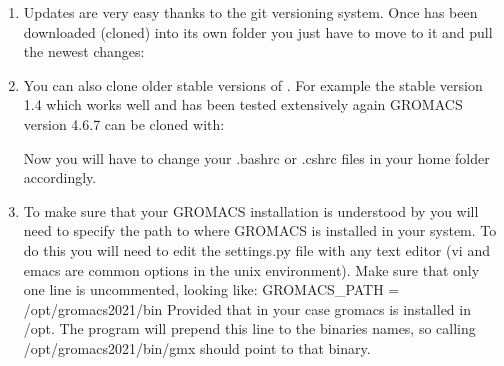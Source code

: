 \documentclass[letterpaper,10pt,english]{sphinxmanual}
\begin{document}
\begin{enumerate}
\item {} 
\sphinxAtStartPar
Updates are very easy thanks to the git versioning system. Once
 has been downloaded (cloned) into its own 
folder you just have to move to it and pull the newest changes:

\begin{sphinxVerbatim}[commandchars=\\\{\}]
 
 
\end{sphinxVerbatim}

\item {} 
\sphinxAtStartPar
You can also clone older stable versions of . For example
the stable version 1.4 which works well and has been tested
extensively again GROMACS version 4.6.7 can be cloned with:

\begin{sphinxVerbatim}[commandchars=\\\{\}]
   \PYGZbs{}
   
\end{sphinxVerbatim}

\sphinxAtStartPar
Now you will have to change your .bashrc or .cshrc files in your home
folder accordingly.

\item {} 
\sphinxAtStartPar
To make sure that your GROMACS installation is understood by
 you will need to specify the path to where GROMACS is
installed in your system. To do this you will need to edit the
settings.py file with any text editor (vi and emacs are common
options in the unix environment). Make sure that only one line is
uncommented, looking like: GROMACS\_PATH = /opt/gromacs\sphinxhyphen{}2021/bin
Provided that in your case gromacs is installed in /opt. The program
will prepend this line to the binaries names, so calling
/opt/gromacs\sphinxhyphen{}2021/bin/gmx should point to that binary.

\end{enumerate}
\end{document}
